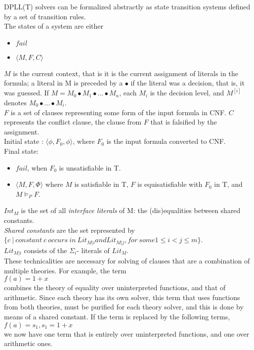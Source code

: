 \documentclass{article}
\begin{document}
DPLL(T) solvers can be formalized abstractly as 
state transition systems defined by a set of transition rules.\\
The states of a system are either
\begin{itemize}
	\item $fail$
	\item $\langle M, F, C \rangle$
\end{itemize}
$M$ is the current context, that is it is the current 
assignment of literals in the formula; a literal in M is 
preceded by a $\bullet$ if the literal was a decision, 
that is, it was guessed. 
If $M = M_0 \bullet M_1 \bullet ... \bullet M_n$, 
each $M_i$ is the decision level, and $M^{[i]}$ 
denotes $M_0 \bullet ... \bullet M_i$. \\
$F$ is a set of clauses representing some form of
the input formula in CNF. $C$ represents the conflict clause,
the clause from $F$ that is falsified by the assignment. \\
Initial state : $\langle \phi, F_0, \phi \rangle$, where $F_0$
is the input formula converted to CNF. \\
Final state:
\begin{itemize}
	\item $fail$, when $F_0$ is unsatisfiable in T.
	\item $\langle M, F, \Phi \rangle$ where $M$ is satisfiable in
	T, $F$ is equisatisfiable with $F_0$ in T, and $M \models_P F$.
\end{itemize}

$Int_M$ is the set of all \textit{interface literals} of M:
the (dis)equalities between shared constants. \\
\textit{Shared constants} are the set represented by \\
$\{c\ |\ constant\ c\ occurs\ in\ Lit_{M|i} and Lit_{M|j}, 
for\ some 1 \leq i < j \leq m\}$. \\
$Lit_{M|i}$ consists of the $\Sigma_i$- literals of $Lit_M$. \\
These technicalities are necessary for solving of clauses 
that are a combination of multiple theories. 
For example, the term \\
$f(a) = 1 + x$ \\
combines the theory of equality over uninterpreted functions,
and that of arithmetic. Since each theory has its own solver,
this term that uses functions from both theories, must be 
purified for each theory solver, and this is done by means of
a shared constant. If the term is replaced by the following 
terms, \\
$f(a) = s_1, s_1 = 1 + x$ \\
we now have one term that is entirely over uninterpreted 
functions, and one over arithmetic ones. \\
\end{document}
